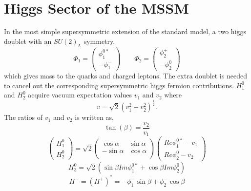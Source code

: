 \section{Higgs Sector of the MSSM}
In the most simple supersymmetric extension of the standard model,
a two higgs doublet 
with an $SU(2)_{L}$ symmetry,
\begin{equation}
\Phi_{1}=
\left(
    \begin{array}{c}
      \phi_{1}^{0*} \\
      -\phi_{1}^{-}
    \end{array}
  \right) 
 \qquad
\Phi_{2}=
\left(
    \begin{array}{c}
      \phi_{2}^{+} \\
      -\phi_{2}^{0}
    \end{array}
  \right) 
\end{equation}
which gives mass to the quarks and charged leptons. The extra doublet
is needed to cancel out the corresponding supersymmetric higgs fermion
contributions.
$H_{1}^{0}$ and $H_{2}^{0}$ acquire vacuum expectation values $v_{1}$ and $v_{2}$ where
\begin{equation}
v = \sqrt{2}(v_{1}^{2}+v_{2}^{2})^{\frac{1}{2}}.
\end{equation}
The ratios of $v_{1}$ and $v_{2}$ is written as,
\begin{equation}
\tan(\beta)=\frac{v_{2}}{v_{1}}
\end{equation}
\begin{equation}
\left(
    \begin{array}{c}
      H^{0}_{1} \\
     H^{0}_{2}
    \end{array}
  \right) 
  =
  \sqrt{2}
  \begin{pmatrix}
  \cos{\alpha} & \sin{\alpha}\\
  -\sin{\alpha}& \cos{\alpha}\\
  \end{pmatrix}
\left(
      \begin{array}{c}
      Re{\phi}_{1}^{0*}-v_{1} \\
     Re{\phi}_{2}^{0}-v_{2}
    \end{array}
  \right) 
\end{equation}
\begin{equation}
H_{3}^{0}=\sqrt{2}(\sin{\beta}Im\phi_{1}^{0*}+\cos{\beta}Im\phi^{0}_{2})
\end{equation}
\begin{equation}
H^{-}=(H^{+})^{*}=-\phi_{1}^{-}\sin{\beta}+\phi_{2}^{-}\cos{\beta}
\end{equation}

